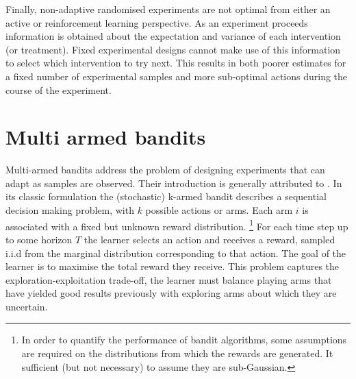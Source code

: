 \documentclass[11pt,a4paper,oneside]{book}
\theoremstyle{plain}
\theoremstyle{definition}
\begin{document}
Finally, non-adaptive randomised experiments are not optimal from either an active or reinforcement learning perspective. As an experiment proceeds information is obtained about the expectation and variance of each intervention (or treatment). Fixed experimental designs cannot make use of this information to select which intervention to try next. This results in both poorer estimates for a fixed number of experimental samples and more sub-optimal actions during the course of the experiment.

\section{Multi armed bandits}
\label{sec:multi-armed-bandits}

Multi-armed bandits address the problem of designing experiments that can adapt as samples are observed. Their introduction is generally attributed to \citet{Thompson1993}. In its classic formulation \citep{Robbins1952,Lai1985} the (stochastic) k-armed bandit describes a sequential decision making problem, with $k$ possible actions or arms. Each arm $i$ is associated with a fixed but unknown reward distribution. \footnote{In order to quantify the performance of bandit algorithms, some assumptions are required on the distributions from which the rewards are generated. It sufficient (but not necessary) to assume they are sub-Gaussian.} For each time step up to some horizon $T$ the learner selects an action and receives a reward, sampled i.i.d from the marginal distribution corresponding to that action. The goal of the learner is to maximise the total reward they receive. This problem captures the exploration-exploitation trade-off, the learner must balance playing arms that have yielded good results previously with exploring arms about which they are uncertain.
\end{document}
